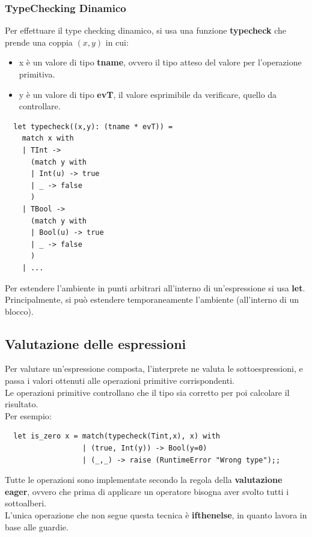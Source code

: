 \documentclass[12pt,a4paper]{article}
\begin{document}
\subsubsection{TypeChecking Dinamico}
Per effettuare il type checking dinamico, si usa una funzione \textbf{typecheck} che prende una coppia $(x, y)$ in cui:
\begin{itemize}
  \item x è un valore di tipo \textbf{tname}, ovvero il tipo atteso del valore per l'operazione primitiva.
  \item y è un valore di tipo \textbf{evT}, il valore esprimibile da verificare, quello da controllare.
\end{itemize}
\begin{lstlisting}
  let typecheck((x,y): (tname * evT)) =
    match x with
    | TInt -> 
      (match y with
      | Int(u) -> true
      | _ -> false
      )
    | TBool ->
      (match y with
      | Bool(u) -> true
      | _ -> false
      )
    | ...
\end{lstlisting}
Per estendere l'ambiente in punti arbitrari all'interno di un'espressione si usa \textbf{let}.\\
Principalmente, si può estendere temporaneamente l'ambiente (all'interno di un blocco).
\subsection{Valutazione delle espressioni}
Per valutare un'espressione composta, l'interprete ne valuta le sottoespressioni, e passa i valori ottenuti alle operazioni primitive corrispondenti.\\
Le operazioni primitive controllano che il tipo sia corretto per poi calcolare il risultato.\\
Per esempio:
\begin{lstlisting}
  let is_zero x = match(typecheck(Tint,x), x) with
                  | (true, Int(y)) -> Bool(y=0)
                  | (_,_) -> raise (RuntimeError "Wrong type");;
\end{lstlisting}
Tutte le operazioni sono implementate secondo la regola della \textbf{valutazione eager}, ovvero che prima di applicare un operatore bisogna aver svolto tutti i sottoalberi.\\
L'unica operazione che non segue questa tecnica è \textbf{ifthenelse}, in quanto lavora in base alle guardie.
\end{document}
